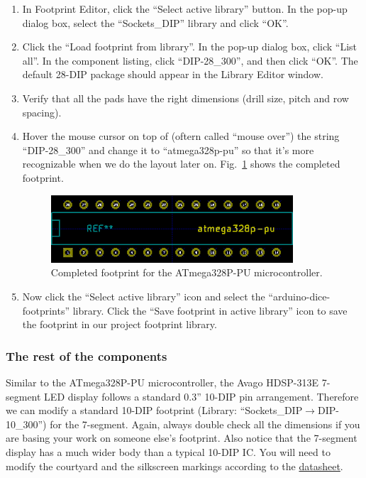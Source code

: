 \documentclass[12pt,letterpaper]{scrartcl}
\begin{document}
\begin{enumerate}
	\item In Footprint Editor, click the ``Select active library'' button. In the pop-up dialog box, select the ``Sockets\_DIP'' library and click ``OK''. 
	
	\item Click the ``Load footprint from library''. In the pop-up dialog box, click ``List all''. In the component listing, click ``DIP-28\_300'', and then click ``OK''. The default 28-DIP package should appear in the Library Editor window.
	
	\item Verify that all the pads have the right dimensions (drill size, pitch and row spacing). 
	
	\item Hover the mouse cursor on top of (oftern called ``mouse over'') the string ``DIP-28\_300'' and change it to ``atmega328p-pu'' so that it's more recognizable when we do the layout later on. Fig.~\ref{fig:atmega328p-footprint-final} shows the completed footprint.
		\begin{figure}[hp]
			\centering
			\includegraphics[width=3.55in]{atmega328p-footprint-final}
			\caption{Completed footprint for the ATmega328P-PU microcontroller.}
			\label{fig:atmega328p-footprint-final}
		\end{figure}
		
	\item Now click the ``Select active library'' icon and select the ``arduino-dice-footprints'' library. Click the ``Save footprint in active library'' icon to save the footprint in our project footprint library. 
\end{enumerate}

\subsubsection{The rest of the components}
Similar to the ATmega328P-PU microcontroller, the Avago HDSP-313E 7-segment LED display follows a standard 0.3'' 10-DIP pin arrangement. Therefore we can modify a standard 10-DIP footprint (Library: ``Sockets\_DIP$\rightarrow $DIP-10\_300'') for the 7-segment. Again, always double check all the dimensions if you are basing your work on someone else's footprint. Also notice that the 7-segment display has a much wider body than a typical 10-DIP IC. You will need to modify the courtyard and the silkscreen markings according to the \href{http://www.avagotech.com/docs/AV02-3585EN}{datasheet}. 
\end{document}

